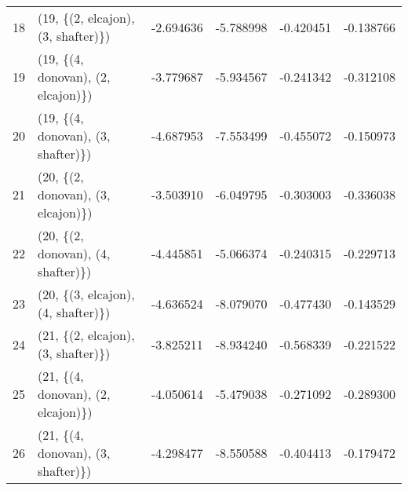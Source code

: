 \begin{tabular}{llrrrr}
18 &  (19, \{(2, elcajon), (3, shafter)\}) &  -2.694636 &  -5.788998 &  -0.420451 & -0.138766 \\
19 &  (19, \{(4, donovan), (2, elcajon)\}) &  -3.779687 &  -5.934567 &  -0.241342 & -0.312108 \\
20 &  (19, \{(4, donovan), (3, shafter)\}) &  -4.687953 &  -7.553499 &  -0.455072 & -0.150973 \\
21 &  (20, \{(2, donovan), (3, elcajon)\}) &  -3.503910 &  -6.049795 &  -0.303003 & -0.336038 \\
22 &  (20, \{(2, donovan), (4, shafter)\}) &  -4.445851 &  -5.066374 &  -0.240315 & -0.229713 \\
23 &  (20, \{(3, elcajon), (4, shafter)\}) &  -4.636524 &  -8.079070 &  -0.477430 & -0.143529 \\
24 &  (21, \{(2, elcajon), (3, shafter)\}) &  -3.825211 &  -8.934240 &  -0.568339 & -0.221522 \\
25 &  (21, \{(4, donovan), (2, elcajon)\}) &  -4.050614 &  -5.479038 &  -0.271092 & -0.289300 \\
26 &  (21, \{(4, donovan), (3, shafter)\}) &  -4.298477 &  -8.550588 &  -0.404413 & -0.179472 \\
\bottomrule
\end{tabular}

